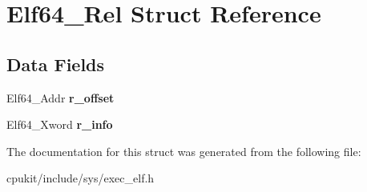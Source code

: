 \hypertarget{structElf64__Rel}{}\section{Elf64\+\_\+\+Rel Struct Reference}
\label{structElf64__Rel}
\subsection*{Data Fields}
\begin{DoxyCompactItemize}
\item 
\mbox{\label{structElf64__Rel_af719169bd59569a885bf9d5df794b951}} 
Elf64\+\_\+\+Addr {\bfseries r\+\_\+offset}
\item 
\mbox{\label{structElf64__Rel_a775740962c9bd1e3f956bd8bffca173b}} 
Elf64\+\_\+\+Xword {\bfseries r\+\_\+info}
\end{DoxyCompactItemize}


The documentation for this struct was generated from the following file\+:\begin{DoxyCompactItemize}
\item 
cpukit/include/sys/exec\+\_\+elf.\+h\end{DoxyCompactItemize}
